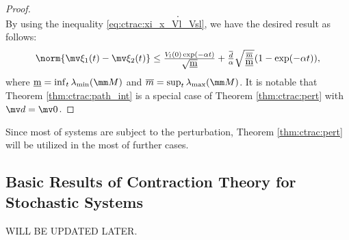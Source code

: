\begin{proof}
\begin{equation}
        .
    \end{equation}
    By using the inequality \eqref{eq:ctrac:xi_x_Vl_Vsl}, we have the desired result as follows:
    \begin{equation}
        \norm{\mv\xi_1(t)-\mv\xi_2(t)}
        \le
        \tfrac{V_{l}(0) \exp(-\alpha t)}{\sqrt{\underbar{m}}}
        +
        \tfrac{\overline d}{\alpha}
        \sqrt{\tfrac{\overline m}{\underbar m}}
        (1-\exp(-\alpha t))
        ,
    \end{equation}
    where $\underbar m=\inf_t\lambda_{\min}(\mm M)$ and $\overline m=\sup_t\lambda_{\max}(\mm M)$.
    It is notable that Theorem \ref{thm:ctrac:path_int} is a special case of Theorem \ref{thm:ctrac:pert} with $\bdd=\mv 0$.
\end{proof}

Since most of systems are subject to the perturbation, Theorem \ref{thm:ctrac:pert} will be utilized in the most of further cases.

\subsection{Basic Results of Contraction Theory for Stochastic Systems}

\color{red}
WILL BE UPDATED LATER.
\color{black}